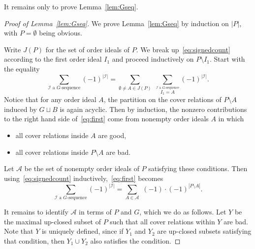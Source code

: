 









It remains only to prove Lemma~\ref{lem:Gseq}.
\begin{proof}[Proof of Lemma~\ref{lem:Gseq}] We prove Lemma~\ref{lem:Gseq} by induction on $|P|$, with $P=\emptyset$ being obvious. 

Write $J(P)$ for the set of order ideals of $P$. 
We break up~\eqref{eq:signedcount} according to the first order ideal $I_1$ and proceed inductively on $P\setminus I_1$. Start with the equality
\begin{equation}\label{eq:first}
\sum_\text{$\mathcal{I}$ a $G$-sequence} \! (-1)^{|\mathcal{I}|} = \sum_{\emptyset\ne A \in J(P)} \,\,\sum_{\stackrel{\text{$\mathcal{I}$ a $G$-sequence}}{I_1=A}} (-1)^{|\mathcal{I}|}.
\end{equation}
Notice that for any order ideal $A$, the partition on the cover relations of $P\setminus A$ induced by $G\sqcup B$ is again acyclic. Then by induction, the nonzero contributions to the right hand side of~\eqref{eq:first} come from nonempty order ideals $A$ in which 
\begin{itemize}
\item all cover relations inside $A$ are good,
\item all cover relations inside $P\setminus A$ are bad.
\end{itemize}

Let $\mathcal{A}$ be the set of nonempty order ideals of $P$ satisfying these conditions. Then using~\eqref{eq:signedcount} inductively,~\eqref{eq:first} becomes
\begin{equation}\label{eq:second}
\sum_\text{$\mathcal{I}$ a $G$-sequence} \! (-1)^{|\mathcal{I}|} = \sum_{A\in \mathcal{A}} \,\,(-1)\cdot (-1)^{|P\setminus A|}.
\end{equation}

It remains to identify $\mathcal{A}$ in terms of $P$ and $G$, which we do as follows. Let $Y$ be the maximal up-closed subset of $P$ such that all cover relations within $Y$ are bad. Note that $Y$ is uniquely defined, since if $Y_1$ and $Y_2$ are up-closed subsets satisfying that condition, then $Y_1\cup Y_2$ also satisfies the condition. 


\end{proof}
